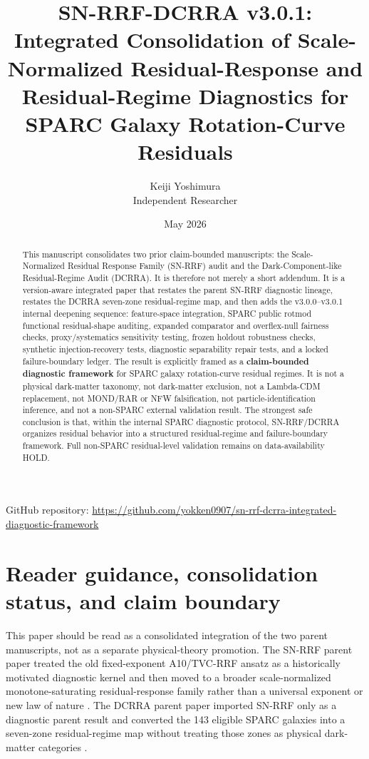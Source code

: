 \documentclass[11pt]{article}
\title{SN-RRF-DCRRA v3.0.1: Integrated Consolidation of Scale-Normalized Residual-Response and Residual-Regime Diagnostics for SPARC Galaxy Rotation-Curve Residuals}
\author{Keiji Yoshimura\\Independent Researcher}
\date{May 2026}
\newcommand{\claimboundary}{\textbf{claim-bounded diagnostic framework}}
\begin{document}
\maketitle

\begin{center}
\small GitHub repository: \url{https://github.com/yokken0907/sn-rrf-dcrra-integrated-diagnostic-framework}
\end{center}

\begin{abstract}
This manuscript consolidates two prior claim-bounded manuscripts: the Scale-Normalized Residual Response Family (SN-RRF) audit and the Dark-Component-like Residual-Regime Audit (DCRRA). It is therefore not merely a short addendum. It is a version-aware integrated paper that restates the parent SN-RRF diagnostic lineage, restates the DCRRA seven-zone residual-regime map, and then adds the v3.0.0--v3.0.1 internal deepening sequence: feature-space integration, SPARC public rotmod functional residual-shape auditing, expanded comparator and overflex-null fairness checks, proxy/systematics sensitivity testing, frozen holdout robustness checks, synthetic injection-recovery tests, diagnostic separability repair tests, and a locked failure-boundary ledger. The result is explicitly framed as a \claimboundary{} for SPARC galaxy rotation-curve residual regimes. It is not a physical dark-matter taxonomy, not dark-matter exclusion, not a Lambda-CDM replacement, not MOND/RAR or NFW falsification, not particle-identification inference, and not a non-SPARC external validation result. The strongest safe conclusion is that, within the internal SPARC diagnostic protocol, SN-RRF/DCRRA organizes residual behavior into a structured residual-regime and failure-boundary framework. Full non-SPARC residual-level validation remains on data-availability HOLD.
\end{abstract}

\section{Reader guidance, consolidation status, and claim boundary}
This paper should be read as a consolidated integration of the two parent manuscripts, not as a separate physical-theory promotion. The SN-RRF parent paper treated the old fixed-exponent A10/TVC-RRF ansatz as a historically motivated diagnostic kernel and then moved to a broader scale-normalized monotone-saturating residual-response family rather than a universal exponent or new law of nature \cite{yoshimura_snrrf}. The DCRRA parent paper imported SN-RRF only as a diagnostic parent result and converted the 143 eligible SPARC galaxies into a seven-zone residual-regime map without treating those zones as physical dark-matter categories \cite{yoshimura_dcrra}.
\end{document}
